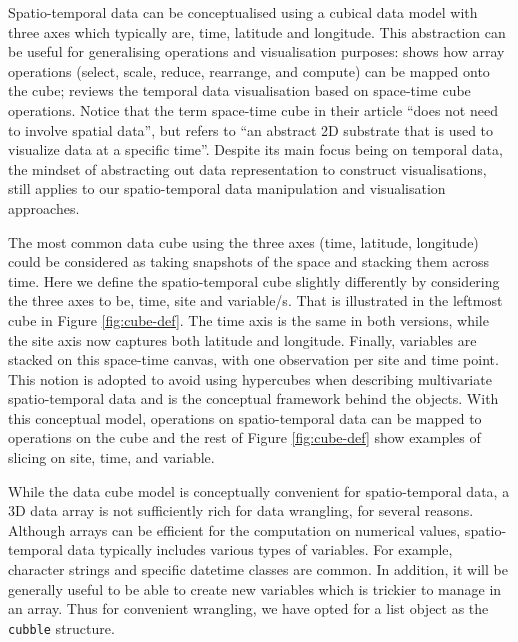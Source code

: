 \documentclass[
]{jss}
\begin{document}
Spatio-temporal data can be conceptualised using a cubical data model with three axes which typically are, time, latitude and longitude. This abstraction can be useful for generalising operations and visualisation purposes: \citet{lu_multidimensional_2018} shows how array operations (select, scale, reduce, rearrange, and compute) can be mapped onto the cube; \citet{bach_review_2014} reviews the temporal data visualisation based on space-time cube operations. Notice that the term space-time cube in their article ``does not need to involve spatial data'', but refers to ``an abstract 2D substrate that is used to visualize data at a specific time''. Despite its main focus being on temporal data, the mindset of abstracting out data representation to construct visualisations, still applies to our spatio-temporal data manipulation and visualisation approaches.

The most common data cube using the three axes (time, latitude, longitude) could be considered as taking snapshots of the space and stacking them across time. Here we define the spatio-temporal cube slightly differently by considering the three axes to be, time, site and variable/s. That is illustrated in the leftmost cube in Figure \ref{fig:cube-def}. The time axis is the same in both versions, while the site axis now captures both latitude and longitude. Finally, variables are stacked on this space-time canvas, with one observation per site and time point. This notion is adopted to avoid using hypercubes when describing multivariate spatio-temporal data and is the conceptual framework behind the  objects. With this conceptual model, operations on spatio-temporal data can be mapped to operations on the cube and the rest of Figure \ref{fig:cube-def} show examples of slicing on site, time, and variable.

While the data cube model is conceptually convenient for spatio-temporal data, a 3D data array is not sufficiently rich for data wrangling, for several reasons. Although arrays can be efficient for the computation on numerical values, spatio-temporal data typically includes various types of variables. For example, character strings and specific datetime classes are common. In addition, it will be generally useful to be able to create new variables which is trickier to manage in an array. Thus for convenient wrangling, we have opted for a list object as the \texttt{cubble} structure.
\end{document}
